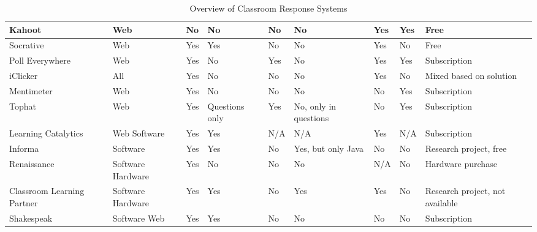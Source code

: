 \begin{landscape}
\begin{center}
\begin{table}[H]
\begin{tabularx}{\paperwidth}{ |X|X|X|X|X|X|X|X|X| }
              Kahoot                & Web   & No    & No    & \cellcolor{red!25}No    & \cellcolor{red!25}No    & Yes   & Yes   & Free \\ \hline
              Socrative             & Web   & Yes   & Yes   & \cellcolor{red!25}No    & \cellcolor{red!25}No    & Yes   & No    & Free \\ \hline
              Poll Everywhere       & Web   & Yes   & No    & \cellcolor{green!25}Yes   & \cellcolor{red!25}No    & Yes   & Yes   & Subscription \\ \hline
              iClicker              & All   & Yes   & No    & \cellcolor{red!25}No    & \cellcolor{red!25}No    & Yes   & No    & Mixed based on solution \\ \hline
              Mentimeter            & Web   & Yes & No   & \cellcolor{red!25}No    & \cellcolor{red!25}No    & No    & Yes   & Subscription \\ \hline
              Tophat                & Web   & Yes & Questions only & \cellcolor{green!25}Yes & \cellcolor{red!25}No, only in questions   & No    & Yes & Subscription \\ \hline
              Learning Catalytics   & Web \newline Software   & Yes    & Yes  & N/A   & N/A   & Yes   & N/A   & Subscription \\ \hline
              Informa        & Software & Yes & Yes  & \cellcolor{red!25}No & \cellcolor{green!25}Yes, but only Java   & No    & No    & Research project, free \\ \hline
              Renaissance           & Software \newline Hardware & Yes & No & \cellcolor{red!25} No & \cellcolor{red!25}No & N/A & No & Hardware purchase \\ \hline
              Classroom Learning Partner & Software \newline Hardware & Yes & Yes & \cellcolor{red!25}No & \cellcolor{green!25}Yes & Yes & No & Research project, not available \\ \hline
              Shakespeak            & Software \newline Web & Yes & Yes & \cellcolor{red!25}No & \cellcolor{red!25}No & No & No & Subscription \\
              \hline
            \end{tabularx}
            \caption{Overview of Classroom Response Systems}\label{tab:overview}
        \end{table}
    \end{center}
\end{landscape}






